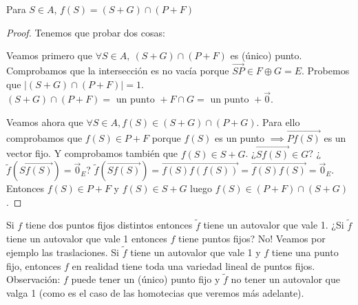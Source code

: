 \documentclass[14pt]{book}
\begin{document}
\begin{pro}
	Para $S \in A$, $f(S) = (S + G) \cap (P + F)$
\end{pro}
\begin{proof}Tenemos que probar dos cosas:
	
	Veamos primero que $\forall S \in A,\ (S + G) \cap (P + F)$ es  (único) punto. Comprobamos que la intersección es no vacía porque $\overrightarrow{SP} \in F \oplus G = E$. Probemos que $\vert (S + G) \cap (P + F)\vert = 1$. $(S + G) \cap (P + F) = \text{ un punto } + F \cap G = \text{ un punto } + \vec{0}$.
	
	Veamos ahora que $\forall S \in A, f(S) \in (S + G) \cap (P + G)$. Para ello comprobamos que $f(S) \in P + F$ porque $f(S)$ es un punto $\implies \overrightarrow{P f(S)}$ es un vector fijo. Y comprobamos también que $f(S) \in S + G$. ¿$\overrightarrow{S f(S)} \in G$? ¿$\tilde{f}(\overrightarrow{S f(S)}) = \vec{0}_E$? $\tilde{f}(\overrightarrow{S f(S)}) = \overrightarrow{f(S) f(f(S))} = \overrightarrow{f(S) f(S)} = \vec{0}_E$. Entonces $f(S) \in P + F$ y $f(S) \in S + G$ luego $f(S) \in (P + F) \cap (S + G)$. 
\end{proof}

Si $f$ tiene dos puntos fijos distintos entonces $\tilde{f}$ tiene un autovalor que vale 1. ¿Si $\tilde{f}$ tiene un autovalor que vale 1 entonces $f$ tiene puntos fijos? No! Veamos por ejemplo las traslaciones. Si $\tilde{f}$ tiene un autovalor que vale 1 y $f$ tiene una punto fijo, entonces $f$ en realidad tiene toda una variedad lineal de puntos fijos. Observación: $f$ puede tener un (único) punto fijo y $\tilde{f}$ no tener un autovalor que valga 1 (como es el caso de las homotecias que veremos más adelante).
\end{document}
